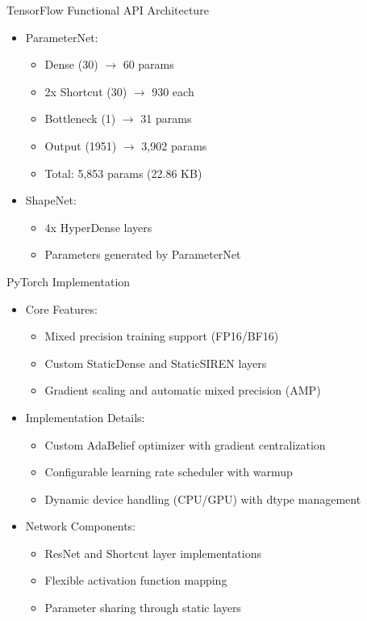\documentclass{beamer}
\begin{document}
\begin{frame}{TensorFlow Functional API Architecture}
    \begin{itemize}
        \item ParameterNet:
        \begin{itemize}
            \item Dense (30) $\rightarrow$ 60 params
            \item 2x Shortcut (30) $\rightarrow$ 930 each
            \item Bottleneck (1) $\rightarrow$ 31 params
            \item Output (1951) $\rightarrow$ 3,902 params
            \item Total: 5,853 params (22.86 KB)
        \end{itemize}
        \item ShapeNet:
        \begin{itemize}
            \item 4x HyperDense layers
            \item Parameters generated by ParameterNet
        \end{itemize}
    \end{itemize}
\end{frame}

\begin{frame}{PyTorch Implementation}
    \begin{itemize}
        \item Core Features:
        \begin{itemize}
            \item Mixed precision training support (FP16/BF16)
            \item Custom StaticDense and StaticSIREN layers
            \item Gradient scaling and automatic mixed precision (AMP)
        \end{itemize}
        \item Implementation Details:
        \begin{itemize}
            \item Custom AdaBelief optimizer with gradient centralization
            \item Configurable learning rate scheduler with warmup
            \item Dynamic device handling (CPU/GPU) with dtype management
        \end{itemize}
        \item Network Components:
        \begin{itemize}
            \item ResNet and Shortcut layer implementations
            \item Flexible activation function mapping
            \item Parameter sharing through static layers
        \end{itemize}
    \end{itemize}
\end{frame}
\end{document}
